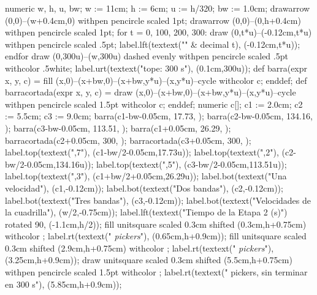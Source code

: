 {\startMPcode
numeric w, h, u, bw; w := 11cm; h := 6cm; u := h/320; bw := 1.0cm;
drawarrow (0,0)--(w+0.4cm,0) withpen pencircle scaled 1pt;
drawarrow (0,0)--(0,h+0.4cm) withpen pencircle scaled 1pt;
for t = 0, 100, 200, 300:
  draw (0,t*u)--(-0.12cm,t*u) withpen pencircle scaled .5pt;
  label.lft(textext("\tfx " & decimal t), (-0.12cm,t*u));
endfor
draw (0,300u)--(w,300u) dashed evenly withpen pencircle scaled .5pt withcolor .5white;
label.urt(textext("\tfx tope: 300 s"), (0.1cm,300u));
def barra(expr x, y, c) =
  fill (x,0)--(x+bw,0)--(x+bw,y*u)--(x,y*u)--cycle withcolor c;
enddef;
def barracortada(expr x, y, c) =
  draw (x,0)--(x+bw,0)--(x+bw,y*u)--(x,y*u)--cycle withpen pencircle scaled 1.5pt withcolor c;
enddef;
numeric c[]; c1 := 2.0cm; c2 := 5.5cm; c3 := 9.0cm;
barra(c1-bw-0.05cm, 17.73, );
barra(c2-bw-0.05cm, 134.16, );
barra(c3-bw-0.05cm, 113.51, );
barra(c1+0.05cm, 26.29, );
barracortada(c2+0.05cm, 300, );
barracortada(c3+0.05cm, 300, );
label.top(textext(",7"), (c1-bw/2-0.05cm,17.73u));
label.top(textext(",2"), (c2-bw/2-0.05cm,134.16u));
label.top(textext(",5"), (c3-bw/2-0.05cm,113.51u));
label.top(textext(",3"), (c1+bw/2+0.05cm,26.29u));
label.bot(textext("\tfx Una velocidad"), (c1,-0.12cm));
label.bot(textext("\tfx Dos bandas"), (c2,-0.12cm));
label.bot(textext("\tfx Tres bandas"), (c3,-0.12cm));
label.bot(textext("Velocidades de la cuadrilla"), (w/2,-0.75cm));
label.lft(textext("Tiempo de la Etapa 2 (s)") rotated 90, (-1.1cm,h/2));
fill unitsquare scaled 0.3cm shifted (0.3cm,h+0.75cm) withcolor ;
label.rt(textext(" {\em pickers}"), (0.65cm,h+0.9cm));
fill unitsquare scaled 0.3cm shifted (2.9cm,h+0.75cm) withcolor ;
label.rt(textext(" {\em pickers}"), (3.25cm,h+0.9cm));
draw unitsquare scaled 0.3cm shifted (5.5cm,h+0.75cm) withpen pencircle scaled 1.5pt withcolor ;
label.rt(textext(" pickers, sin terminar en 300 s"), (5.85cm,h+0.9cm));
\stopMPcode}

